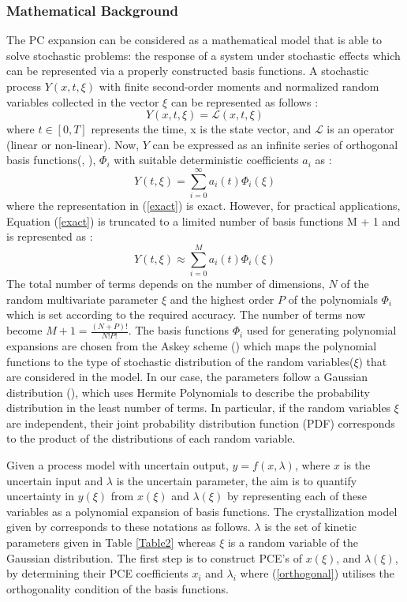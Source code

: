 \documentclass[3p,times,authoryear]{elsarticle}
\begin{document}
\subsubsection{Mathematical Background} \label{mathback}
The PC expansion can be considered as a mathematical model that is able to solve stochastic problems: the response of a system under stochastic effects which can be represented via a properly constructed basis functions. A stochastic process $Y(x,t,\xi)$ with finite second-order moments and normalized random variables collected in the vector $\xi$ can be represented as follows : 
\begin{equation}
Y(x,t,\xi) = \mathcal{L}(x,t,\xi)
\end{equation}
where $t \in [0, T]$ represents the time, x is the state vector, and $\mathcal{L}$ is an operator (linear or non-linear).
Now, $Y$ can be expressed as an infinite series of orthogonal basis functions(\cite{ghanem}, \cite{ghanem1997}), $\Phi_{i}$ with suitable deterministic coefficients $a_{i}$ as :
\begin{equation} \label{exact}
Y(t,\xi) =  \sum_{i=0}^{\infty} a_{i}(t)\Phi_{i}(\xi)
\end{equation}
where the representation in (\ref{exact}) is exact. However, for practical applications, Equation (\ref{exact}) is
truncated to a limited number of basis functions M + 1 and is represented as :
\begin{equation} \label{approx}
Y(t,\xi) \approx \sum_{i=0}^{M} a_{i}(t)\Phi_{i}(\xi)
\end{equation}
The total number of terms depends on the number of dimensions, $N$ of the random multivariate parameter $\xi$ and the highest order $P$ of the polynomials $\Phi_{i}$ which is set according to the required accuracy. The number of terms now become $ M + 1 = \frac{(N+P)!}{N!P!} $. The basis functions $\Phi_{i}$ used for generating polynomial expansions  are chosen from the Askey scheme (\cite{xiuwiener}) which maps the polynomial functions to the type of stochastic distribution of the random variables($\xi$) that are considered in the model. In our case, the parameters follow a Gaussian distribution (\cite{yenkie}), which uses Hermite Polynomials to describe the probability distribution in the least number of terms. In particular, if the random variables $\xi$ are independent, their joint probability distribution function (PDF) corresponds to the product of the distributions of each random variable. 
\par
Given a process model with uncertain output, $y = f(x,\lambda)$, where $x$ is the uncertain input and $\lambda$ is the uncertain parameter, the aim is to quantify uncertainty in $y(\xi)$ from $x(\xi)$ and $\lambda(\xi)$ by representing each of these variables as a polynomial expansion of basis functions. The crystallization model given by  corresponds to these notations as follows. $\lambda$ is the set of kinetic parameters given in Table \ref{Table2} whereas $\xi$ is a random variable of the Gaussian distribution. The first step is to construct PCE’s of $x(\xi)$, and $\lambda(\xi)$, by determining their PCE coefficients $x_{i}$ and $\lambda_{i}$ where (\ref{orthogonal}) utilises the orthogonality condition of the basis functions.
\end{document}
